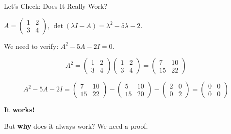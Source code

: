 \documentclass[10pt]{beamer}
\theoremstyle{definition}
\newcommand{\x}[1]{\alert{\textbf{#1}}}
\begin{document}
\begin{frame}{Let's Check: Does It Really Work?}

$A = \begin{pmatrix} 1 & 2 \\ 3 & 4 \end{pmatrix}$, \quad
$\det(\lambda I - A) = \lambda^2 - 5\lambda - 2$.

\vfill

We need to verify: $A^2 - 5A - 2I = 0$.

\vfill

$$A^2 = \begin{pmatrix} 1 & 2 \\ 3 & 4 \end{pmatrix}\begin{pmatrix} 1 & 2 \\ 3 & 4 \end{pmatrix} = \begin{pmatrix} 7 & 10 \\ 15 & 22 \end{pmatrix}$$

\vfill

$$A^2 - 5A - 2I = \begin{pmatrix} 7 & 10 \\ 15 & 22 \end{pmatrix} - \begin{pmatrix} 5 & 10 \\ 15 & 20 \end{pmatrix} - \begin{pmatrix} 2 & 0 \\ 0 & 2 \end{pmatrix} = \begin{pmatrix} 0 & 0 \\ 0 & 0 \end{pmatrix}$$

\vfill

\x{It works!}

\vfill

But \x{why} does it always work? We need a proof.

\vfill
\end{frame}
\end{document}
